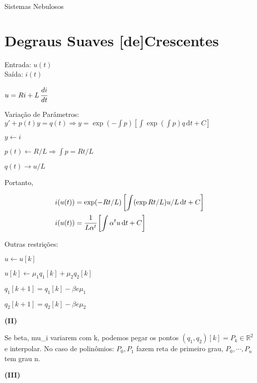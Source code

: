 \documentclass[12pt]{article}
\begin{document}
\Large

\begin{center}
Sistemas Nebulosos
\end{center}

\normalsize

\vspace{3mm}

\section{Degraus Suaves [de]Crescentes}

\begin{flushleft}
Entrada: $u(t)$ \\
Sa\'ida: $i(t)$
\end{flushleft}

$u = Ri + L\, \cfrac{di}{dt}$

Varia\c{c}\~ao de Par\^ametros: $y' + p(t) y = q(t) \Rightarrow y = \exp(-\int p) \left[ \int \exp (\int p) q \,\mathrm{d}t + C \right]$

$y \leftarrow i$

$p(t) \leftarrow R/L \Rightarrow \int p = Rt/L$

$q(t) \rightarrow u/L$

Portanto,

\begin{align}
 i(u(t)) &= \exp(-Rt/L) \left[ \int (\exp Rt/L) u/L \,\mathrm{d}t + C \right] \\
 i(u(t)) &= \cfrac{1}{L \alpha^t} \left[ \int \alpha^t u \,\mathrm{d}t + C \right]
\end{align}

Outras restri\c{c}\~oes:

$u \leftarrow u[k]$

$u[k] \leftarrow \mu_1 q_1[k] + \mu_2 q_2[k]$

$q_1[k+1] = q_1[k] - \beta e \mu_1$

$q_2[k+1] = q_2[k] - \beta e \mu_2$

\vspace{3mm}

\textbf{(II)}

Se beta, mu\_i variarem com k, podemos pegar os pontos $(q_1, q_2)[k] = P_k \in \mathbb{R}^2$ e interpolar. No caso de polin\^omios: $P_0, P_1$ fazem reta de primeiro grau, $P_0, \cdots, P_n$ tem grau n.

\vspace{3mm}

\textbf{(III)}
\end{document}
